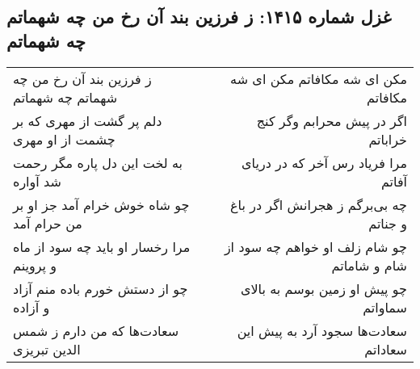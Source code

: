 \begin{center}
\section*{غزل شماره ۱۴۱۵: ز فرزین بند آن رخ من چه شهماتم چه شهماتم}
\label{sec:1415}
\begin{longtable}{l p{0.5cm} r}
ز فرزین بند آن رخ من چه شهماتم چه شهماتم
&&
مکن ای شه مکافاتم مکن ای شه مکافاتم
\\
دلم پر گشت از مهری که بر چشمت از او مهری
&&
اگر در پیش محرابم وگر کنج خراباتم
\\
به لخت این دل پاره مگر رحمت شد آواره
&&
مرا فریاد رس آخر که در دریای آفاتم
\\
چو شاه خوش خرام آمد جز او بر من حرام آمد
&&
چه بی‌برگم ز هجرانش اگر در باغ و جناتم
\\
مرا رخسار او باید چه سود از ماه و پروینم
&&
چو شام زلف او خواهم چه سود از شام و شاماتم
\\
چو از دستش خورم باده منم آزاد و آزاده
&&
چو پیش او زمین بوسم به بالای سماواتم
\\
سعادت‌ها که من دارم ز شمس الدین تبریزی
&&
سعادت‌ها سجود آرد به پیش این سعاداتم
\\
\end{longtable}
\end{center}
